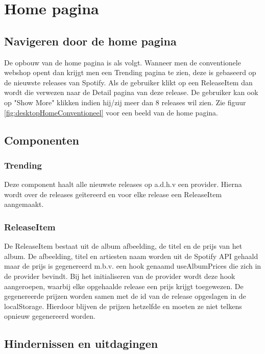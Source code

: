 \pagebreak

\section{Home pagina}

\subsection{Navigeren door de home pagina}
De opbouw van de home pagina is als volgt. Wanneer men de conventionele webshop opent dan krijgt men een Trending pagina te zien, deze is gebaseerd op de nieuwste releases van Spotify. Als de gebruiker klikt op een ReleaseItem dan wordt die verwezen naar de Detail pagina van deze release. De gebruiker kan ook op "Show More" klikken indien hij/zij meer dan 8 releases wil zien. Zie figuur \ref{fig:desktopHomeConventioneel} voor een beeld van de home pagina.

\subsection{Componenten}

\subsubsection{Trending}

Deze component haalt alle nieuwste releases op a.d.h.v een provider. Hierna wordt over de releases geïtereerd en voor elke release een ReleaseItem aangemaakt.

\subsubsection{ReleaseItem}

De ReleaseItem bestaat uit de album afbeelding, de titel en de prijs van het album. De afbeelding, titel en artiesten naam worden uit de Spotify API gehaald maar de prijs is gegenereerd m.b.v. een hook genaamd useAlbumPrices die zich in de provider bevindt. Bij het initialiseren van de provider wordt deze hook aangeroepen, waarbij elke opgehaalde release een prijs krijgt toegewezen. De gegenereerde prijzen worden samen met de id van de release opgeslagen in de localStorage. Hierdoor blijven de prijzen hetzelfde en moeten ze niet telkens opnieuw gegenereerd worden.

\subsection{Hindernissen en uitdagingen}

